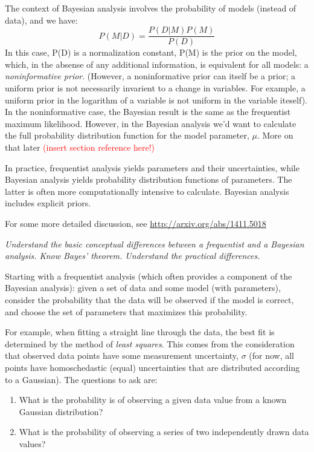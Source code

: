 \documentclass{article}
\newcommand{\test}[1]{%
    \begin{center}
        \colorbox{hl}{\parbox{0.9\textwidth}{\emph{#1}}}
    \end{center}}
\begin{document}
The context of Bayesian analysis involves the probability of models
(instead of data), and we have:
    $$ P(M|D) = \frac{P(D|M)P(M)}{P(D)} $$
In this case, P(D) is a normalization constant, P(M) is the prior on the
model, which, in the absense of any additional information, is equivalent
for all models: a \emph{noninformative prior}. (However, a noninformative
prior can itself be a prior; a uniform prior is not necessarily invarient
to a change in variables. For example, a uniform prior in the logarithm
of a variable is not uniform in the variable iteself).
In the noninformative case, the Bayesian
result is the same as the frequentist maximum likelihood. However, in the
Bayesian analysis we'd want to calculate the full probability distribution
function for the model parameter, $\mu$. More on that later
\textcolor{red}{(insert section reference here!)}

In practice, frequentist analysis yields parameters and their
uncertainties, while Bayesian analysis yields probability distribution
functions of parameters. The latter is often more computationally
intensive to calculate. Bayesian analysis includes explicit priors.

For some more detailed discussion, see
\url{http://arxiv.org/abs/1411.5018}

\test{Understand the basic conceptual differences between a frequentist
and a Bayesian analysis. Know Bayes' theorem. Understand the practical
differences.}

Starting with a frequentist analysis (which often provides a component of
the Bayesian analysis): given a set of data and some model (with
parameters), consider the probability that the data will be observed if the
model is correct, and choose the set of parameters that maximizes this
probability.

For example, when fitting a straight line through the data, the best fit is
determined by the method of \emph{least squares}. This comes from the
consideration that
observed data points have some measurement uncertainty,
$\sigma$ (for now, all points have homoschedastic (equal) uncertainties
that are distributed according to a Gaussian). The questions to ask are:

\begin{enumerate}
    \item What is the probability is of observing a given data value from a
        known Gaussian distribution?
    \item What is the probability of observing a
        series of two independently drawn data values?
\end{enumerate}
\end{document}
